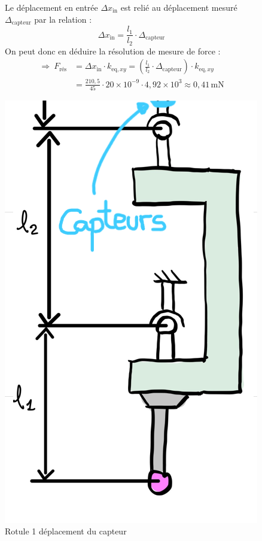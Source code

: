 \documentclass[a4paper, 11pt]{article} %
\begin{document}
\begin{figure}[H]
    \noindent
    \begin{minipage}{0.5\linewidth}
        Le déplacement en entrée $\Delta x_{\text{in}}$ est relié au déplacement mesuré $\Delta_{\text{capteur}}$ par la relation :
        $$
        \Delta x_{\text{in}} = \frac{l_1}{l_2} \cdot \Delta_{\text{capteur}}
        $$
        On peut donc en déduire la résolution de mesure de force :
        \begin{align*}
            \Rightarrow\ F_{\text{rés}} &= \Delta x_{\text{in}} \cdot k_{\text{eq},xy} = \left( \frac{l_1}{l_2} \cdot \Delta_{\text{capteur}} \right) \cdot k_{\text{eq},xy} \\
            &= \frac{210,5}{45} \cdot 20 \times 10^{-9} \cdot 4,92 \times 10^{3} \approx 0{,}41\, \text{mN}
        \end{align*}
    \end{minipage}
    \hfill 
    \begin{minipage}{0.5\linewidth}
    \centering
    \includegraphics[width=0.7\linewidth]{images/mouvement_capteur.png}
    \caption{Rotule 1 déplacement du capteur}
    \label{fig:rotule_1}
    \end{minipage}
\end{figure}
\end{document}
